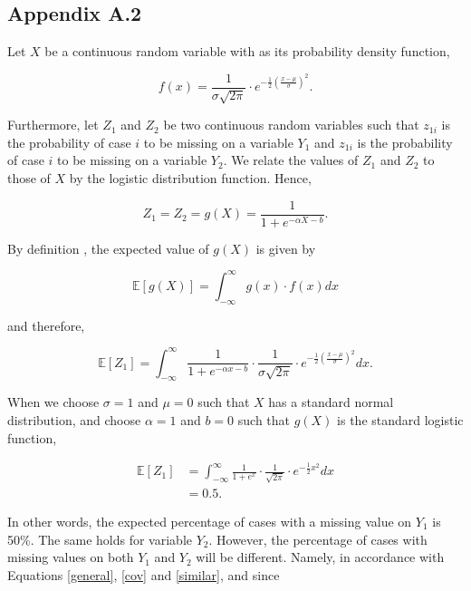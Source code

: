 \documentclass[11pt,a4paper]{article}
\begin{document}
\subsection*{Appendix A.2}

Let $X$ be a continuous random variable with as its probability density function, 

\begin{equation*}
f(x) = \frac{1}{\sigma\sqrt{2\pi}}\cdot e^{-\frac{1}{2}(\frac{x - \mu}{\sigma})^2}.
\end{equation*}

\noindent Furthermore, let $Z_1$ and $Z_2$ be two continuous random variables such that $z_{1i}$ is the probability of case $i$ to be missing on a variable $Y_1$ and $z_{1i}$ is the probability of case $i$ to be missing on a variable $Y_2$. We relate the values of $Z_1$ and $Z_2$ to those of $X$ by the logistic distribution function. Hence, 

\begin{equation*}
Z_1 = Z_2 = g(X) = \frac{1}{1 + e^{-\alpha X - b}}.
\end{equation*}

\noindent By definition \citep{Freund}, the expected value of $g(X)$ is given by 

\begin{equation*}
\mathbb{E}[g(X)] = \int_{-\infty}^\infty g(x) \cdot f(x) dx
\end{equation*}

\noindent and therefore, 

\begin{equation*}
\mathbb{E}[Z_1] = \int_{-\infty}^\infty \frac{1}{1 + e^{-\alpha x - b}} \cdot \frac{1}{\sigma\sqrt{2\pi}}\cdot e^{-\frac{1}{2}(\frac{x - \mu}{\sigma})^2} dx.
\end{equation*}

\noindent When we choose $\sigma = 1$ and $\mu = 0$ such that $X$ has a standard normal distribution, and choose $\alpha = 1$ and $b = 0$ such that $g(X)$ is the standard logistic function, 

\begin{align*}
\mathbb{E}[Z_1] & = \int_{-\infty}^\infty \frac{1}{1 + e^x} \cdot \frac{1}{\sqrt{2\pi}}\cdot e^{-\frac{1}{2}x^2} dx \nonumber \\
& = 0.5.
\end{align*}

\noindent In other words, the expected percentage of cases with a missing value on $Y_1$ is 50\%. The same holds for variable $Y_2$. However, the percentage of cases with missing values on both $Y_1$ and $Y_2$ will be different. Namely, in accordance with Equations \eqref{general}, \eqref{cov} and \eqref{similar}, and since 
\end{document}
